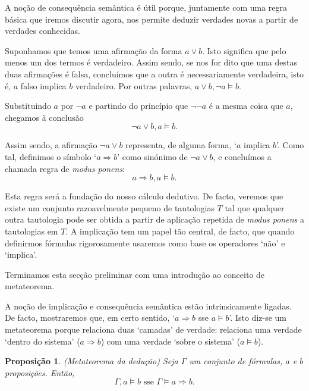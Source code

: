 \documentclass{report}
\newtheorem*{prop*}{Proposição}
\theoremstyle{definition}
\theoremstyle{remark}
\begin{document}
	A noção de consequência semântica é útil porque, juntamente com uma regra básica que iremos discutir agora, nos permite deduzir verdades novas a partir de verdades conhecidas.
	
	Suponhamos que temos uma afirmação da forma $a \lor b$. Isto significa que pelo menos um dos termos é verdadeiro. Assim sendo, se nos for dito que uma destas duas afirmações é falsa, concluímos que a outra é necessariamente verdadeira, isto é, $a$ falso implica $b$ verdadeiro. Por outras palavras, $a \lor b, \neg a \vDash b$.
	
	Substituindo $a$ por $\neg a$ e partindo do princípio que $\neg \neg a$ é a mesma coisa que $a$, chegamos à conclusão
	\[\neg a \lor b, a \vDash b.\]
	
	Assim sendo, a afirmação $\neg a \lor b$ representa, de alguma forma, `$a$ implica $b$'. Como tal, definimos o símbolo `$a \Rightarrow b$' como sinónimo de $\neg a \lor b$, e concluímos a chamada regra de \textit{modus ponens}:
	\[a \Rightarrow b, a \vDash b.\]
	
	Esta regra será a fundação do nosso cálculo dedutivo. De facto, veremos que existe um conjunto razoavelmente pequeno de tautologias $T$ tal que qualquer outra tautologia pode ser obtida a partir de aplicação repetida de \textit{modus ponens} a tautologias em $T$. A implicação tem um papel tão central, de facto, que quando definirmos fórmulas rigorosamente usaremos como base os operadores `não' e `implica'.
	
	\smallskip
	
	Terminamos esta secção preliminar com uma introdução ao conceito de metateorema.
	
	A noção de implicação e consequência semântica estão intrinsicamente ligadas. De facto, mostraremos que, em certo sentido, `$a \Rightarrow b$ sse $a \vDash b$'. Isto diz-se um metateorema porque relaciona duas `camadas' de verdade: relaciona uma verdade `dentro do sistema' ($a \Rightarrow b$) com uma verdade `sobre o sistema' ($a \vDash b$).
	
	\begin{prop*}
	(Metateorema da dedução) Seja $\Gamma$ um conjunto de fórmulas, $a$ e $b$ proposições. Então,
	\[\Gamma, a \vDash b \text{ sse } \Gamma \vDash a \Rightarrow b.\]
	\end{prop*}
	
\end{document}
